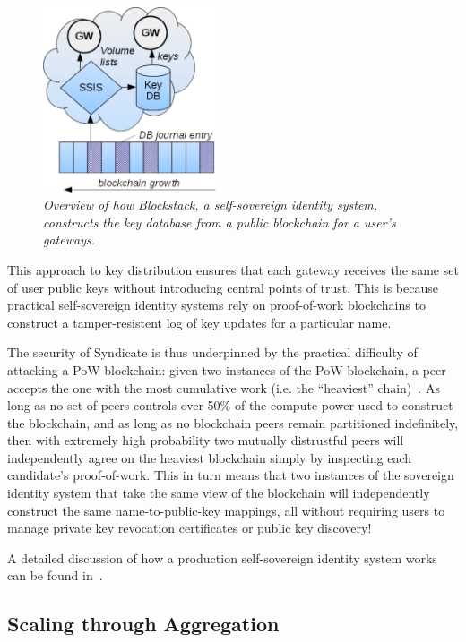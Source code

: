 \begin{figure}[t!]
\centering
\includegraphics[width=0.47\textwidth]{figures/blockstack-overview}
\caption{\it
Overview of how Blockstack, a self-sovereign identity system, constructs the key database from a public blockchain
for a user's gateways.
   }
\label{fig:cert-graph}
\end{figure}

This approach to key distribution ensures that each gateway receives the same
set of user public keys without introducing central points of trust. This is
because practical self-sovereign identity systems rely on proof-of-work
blockchains to construct a tamper-resistent log of key updates for a particular
name.

The security of Syndicate is thus underpinned by the practical difficulty of attacking a
PoW blockchain: given two instances of the PoW blockchain,
a peer accepts the one with the most cumulative work (i.e. the
``heaviest'' chain)~\cite{bitcoin-textbook}. As long as no set of peers controls over 50\% of the
compute power used to construct the blockchain, and as long as no blockchain
peers remain partitioned indefinitely, then with extremely high probability two
mutually distrustful peers will independently agree on the heaviest blockchain
simply by inspecting each candidate's proof-of-work.  This in turn means
that two instances of the sovereign identity system that take the same view of
the blockchain will independently construct the same name-to-public-key
mappings, all without requiring users to manage private key revocation
certificates or public key discovery!

A detailed discussion of how a production self-sovereign identity system
works can be found in~\cite{blockstack}.

\subsection{Scaling through Aggregation}

